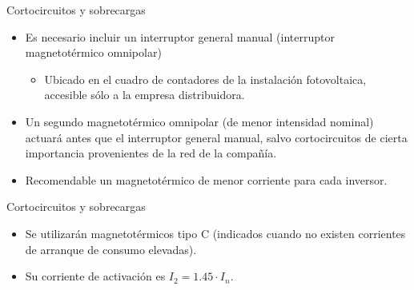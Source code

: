 \documentclass[xcolor={usenames,svgnames,dvipsnames}]{beamer}
\begin{document}
\begin{frame}[label={sec:org793eb56}]{Cortocircuitos y sobrecargas}
\begin{itemize}
\item Es necesario incluir un \alert{interruptor general manual} (interruptor
magnetotérmico omnipolar)

\begin{itemize}
\item Ubicado en el cuadro de contadores de la instalación fotovoltaica,
\alert{accesible sólo a la empresa distribuidora}.
\end{itemize}

\item Un \alert{segundo magnetotérmico omnipolar} (de menor intensidad nominal)
actuará antes que el interruptor general manual, salvo
cortocircuitos de cierta importancia provenientes de la red de la
compañía.

\item Recomendable un magnetotérmico de menor corriente para cada
inversor.
\end{itemize}
\end{frame}

\begin{frame}[label={sec:orgf1c760c}]{Cortocircuitos y sobrecargas}
\begin{itemize}
\item Se utilizarán \alert{magnetotérmicos tipo C} (indicados cuando no existen corrientes de arranque de consumo elevadas).

\item Su corriente de activación es \(I_{2}=1.45\cdot I_{n}\).
\end{itemize}
\end{frame}
\end{document}

